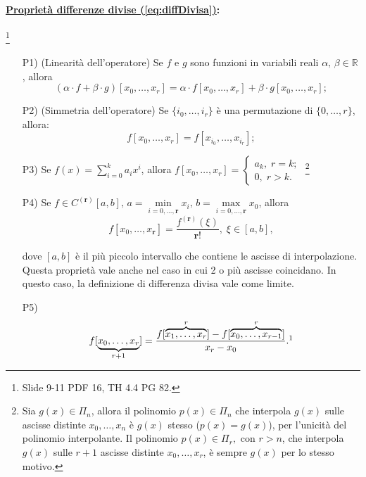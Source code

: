 \paragraph{\underline{Proprietà differenze divise (\ref{eq:diffDivisa})}:} \footnote{Slide 9-11 PDF 16, TH 4.4 PG 82.}
\begin{itemize}
    \item[P1)](Linearità dell'operatore) Se $f$ e $g$ sono funzioni in variabili reali $\alpha,\,\beta \in\mathbb R$, allora
    \begin{equation*}
        (\alpha\cdot f + \beta\cdot g)[x_0,\hdots, x_r]=\alpha\cdot f[x_0,\hdots, x_r]+\beta\cdot g[x_0,\hdots, x_r];
    \end{equation*}
    \item[P2)](Simmetria dell'operatore) Se $\{i_0,\hdots,i_r\}$ è una permutazione di $\{0,\hdots, r\}$, allora:
    \begin{equation*}
        f[x_0,\hdots,x_r]=f[x_{i_0},\hdots,x_{i_r}];
    \end{equation*}
    \item[P3)] Se $f(x)=\sum_{i=0}^ka_ix^i$, allora $f[x_0,\hdots, x_r]=
    \begin{cases}
        a_k,\; r=k;\\
        0,\; r>k.
    \end{cases}$
    \footnote{Sia $g(x)\in\Pi_n$, allora il polinomio $p(x)\in\Pi_n$ che interpola $g(x)$ sulle ascisse distinte $x_0,\hdots,x_n$ è $g(x)$ stesso ($p(x)=g(x)$), per l'unicità del polinomio interpolante.
    Il polinomio $p(x)\in\Pi_r,$ con $r>n$, che interpola $g(x)$ sulle $r+1$ ascisse distinte $x_0, \hdots, x_r$, è sempre $g(x)$ per lo stesso motivo.}

    \item[P4)] Se $f\in C^{(\boldsymbol r)}[a,b],\, a=\underset{i=0,\hdots,\boldsymbol r}{\min}x_i,\, b=\underset{i=0,\hdots,\boldsymbol r}{\max}x_0$, allora
    \begin{equation}\label{eq:P4DiffDiv}
        f[x_0,\hdots, x_{\boldsymbol r}]=\frac{f^{(\boldsymbol r)}(\xi)}{\boldsymbol r!},\; \xi\in [a,b],
    \end{equation}

    dove $[a,b]$ è il più piccolo intervallo che contiene le ascisse di interpolazione. Questa proprietà vale anche nel caso in cui 2 o più ascisse coincidano. In questo caso, la definizione di differenza divisa vale come limite.

    \item[P5)] \begin{equation}\label{eq:P5DiffDiv}
        f[\underbrace{x_0,\hdots,x_r}_{r+1}]=\frac{f[\overbrace{x_1,\hdots,x_r}^{r}]-f[\overbrace{x_0,\hdots,x_{r-1}}^{r}]}{x_r-x_0}.\footnotemark
    \end{equation}
\end{itemize}

